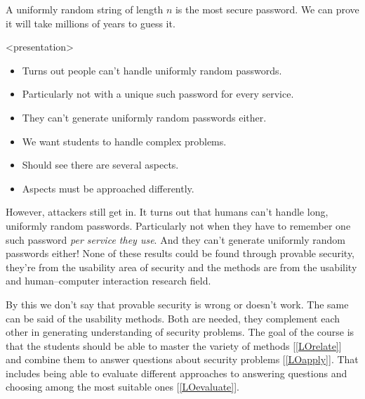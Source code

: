 \begin{example}\label{SecurePassword}
  A uniformly random string of length \(n\) is the most secure password.
  We can prove it will take millions of years to guess it.
\end{example}

\begin{frame}<presentation>
  \begin{example}[Usability]
    \begin{itemize}
      \item Turns out people can't handle uniformly random passwords.
      \item Particularly not with a unique such password for every service.
      \item They can't generate uniformly random passwords either.
    \end{itemize}
  \end{example}

  \pause

  \begin{remark}
    \begin{itemize}
      \item We want students to handle complex problems.
      \item Should see there are several aspects.
      \item Aspects must be approached differently.
    \end{itemize}
  \end{remark}
\end{frame}

However, attackers still get in.
It turns out that humans can't handle long, uniformly random passwords.
Particularly not when they have to remember one such password \emph{per service 
they use}.
And they can't generate uniformly random passwords either!
None of these results could be found through provable security, they're from 
the usability area of security and the methods are from the usability and 
human--computer interaction research field.

By this we don't say that provable security is wrong or doesn't work.
The same can be said of the usability methods.
Both are needed, they complement each other in generating understanding of 
security problems.
The goal of the course is that the students should be able to master the 
variety of methods [\ref{LOrelate}] and combine them to answer questions about 
security problems [\ref{LOapply}].
That includes being able to evaluate different approaches to answering 
questions and choosing among the most suitable ones [\ref{LOevaluate}].

